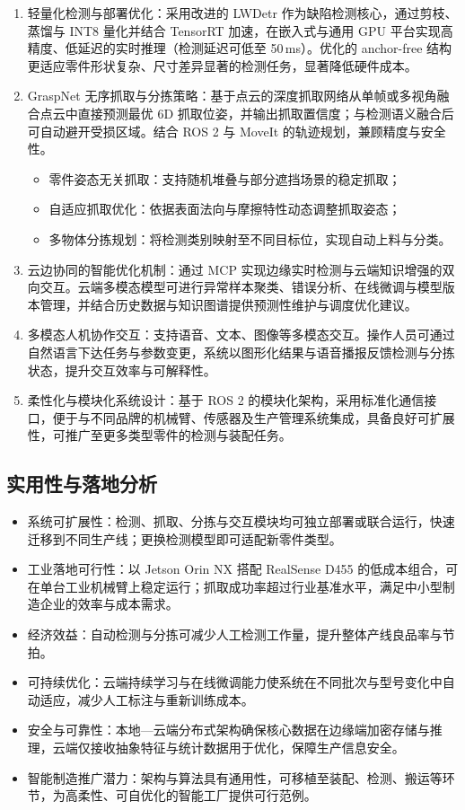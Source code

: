 \documentclass{cumcmthesis}
\begin{document}
\begin{enumerate}
    \item 轻量化检测与部署优化：采用改进的 LWDetr 作为缺陷检测核心，通过剪枝、蒸馏与 INT8 量化并结合 TensorRT 加速，在嵌入式与通用 GPU 平台实现高精度、低延迟的实时推理（检测延迟可低至 50\,ms）。优化的 anchor-free 结构更适应零件形状复杂、尺寸差异显著的检测任务，显著降低硬件成本。
    \item GraspNet 无序抓取与分拣策略：基于点云的深度抓取网络从单帧或多视角融合点云中直接预测最优 6D 抓取位姿，并输出抓取置信度；与检测语义融合后可自动避开受损区域。结合 ROS 2 与 MoveIt 的轨迹规划，兼顾精度与安全性。
    \begin{itemize}
        \item 零件姿态无关抓取：支持随机堆叠与部分遮挡场景的稳定抓取；
        \item 自适应抓取优化：依据表面法向与摩擦特性动态调整抓取姿态；
        \item 多物体分拣规划：将检测类别映射至不同目标位，实现自动上料与分类。
    \end{itemize}
    \item 云边协同的智能优化机制：通过 MCP 实现边缘实时检测与云端知识增强的双向交互。云端多模态模型可进行异常样本聚类、错误分析、在线微调与模型版本管理，并结合历史数据与知识图谱提供预测性维护与调度优化建议。
    \item 多模态人机协作交互：支持语音、文本、图像等多模态交互。操作人员可通过自然语言下达任务与参数变更，系统以图形化结果与语音播报反馈检测与分拣状态，提升交互效率与可解释性。
    \item 柔性化与模块化系统设计：基于 ROS 2 的模块化架构，采用标准化通信接口，便于与不同品牌的机械臂、传感器及生产管理系统集成，具备良好可扩展性，可推广至更多类型零件的检测与装配任务。
\end{enumerate}

\subsection{实用性与落地分析}

\begin{itemize}
    \item 系统可扩展性：检测、抓取、分拣与交互模块均可独立部署或联合运行，快速迁移到不同生产线；更换检测模型即可适配新零件类型。
    \item 工业落地可行性：以 Jetson Orin NX 搭配 RealSense D455 的低成本组合，可在单台工业机械臂上稳定运行；抓取成功率超过行业基准水平，满足中小型制造企业的效率与成本需求。
    \item 经济效益：自动检测与分拣可减少人工检测工作量，提升整体产线良品率与节拍。
    \item 可持续优化：云端持续学习与在线微调能力使系统在不同批次与型号变化中自动适应，减少人工标注与重新训练成本。
    \item 安全与可靠性：本地—云端分布式架构确保核心数据在边缘端加密存储与推理，云端仅接收抽象特征与统计数据用于优化，保障生产信息安全。
    \item 智能制造推广潜力：架构与算法具有通用性，可移植至装配、检测、搬运等环节，为高柔性、可自优化的智能工厂提供可行范例。
\end{itemize}
\end{document}
